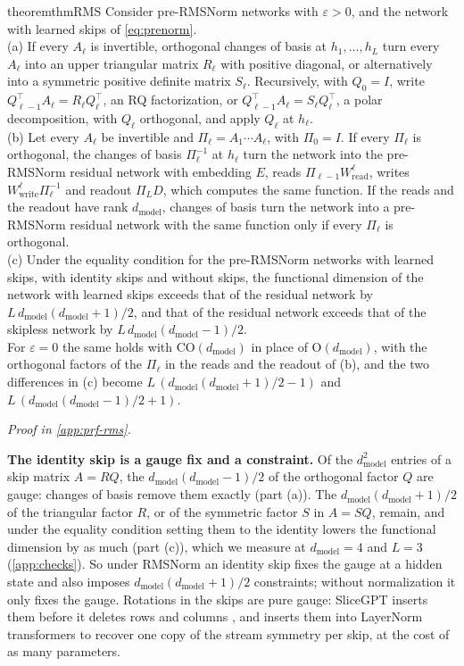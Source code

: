\documentclass[10pt]{article}
\theoremstyle{definition}
\theoremstyle{remark}
\newcommand{\Wread}{W_{\mathrm{read}}}
\newcommand{\Wwrite}{W_{\mathrm{write}}}
\newcommand{\dm}{d_{\mathrm{model}}}
\newcommand{\Ort}{\mathrm{O}}
\newcommand{\CO}{\mathrm{CO}}
\newcommand{\para}[1]{\smallskip\noindent\textbf{#1}\hspace{0.5em}}
\newcommand{\proofin}[1]{\par\vspace{-0.4\baselineskip}\noindent\hfill{\small\itshape Proof in \cref{#1}.}\par\smallskip}
\begin{document}
\begin{restatable}{theorem}{thmRMS}\label{thm:rms}
Consider pre-RMSNorm networks with $\varepsilon > 0$, and the network with learned skips of \cref{eq:prenorm}.\\
\textup{(a)} If every $A_\ell$ is invertible, orthogonal changes of basis at $h_1, \dots, h_L$ turn every $A_\ell$ into an upper triangular matrix $R_\ell$ with positive diagonal, or alternatively into a symmetric positive definite matrix $S_\ell$. Recursively, with $Q_0 = I$, write $Q_{\ell-1}^\top A_\ell = R_\ell Q_\ell^\top$, an RQ factorization, or $Q_{\ell-1}^\top A_\ell = S_\ell Q_\ell^\top$, a polar decomposition, with $Q_\ell$ orthogonal, and apply $Q_\ell$ at $h_\ell$.\\
\textup{(b)} Let every $A_\ell$ be invertible and $\Pi_\ell = A_1\cdots A_\ell$, with $\Pi_0 = I$. If every $\Pi_\ell$ is orthogonal, the changes of basis $\Pi_\ell^{-1}$ at $h_\ell$ turn the network into the pre-RMSNorm residual network with embedding $E$, reads $\Pi_{\ell-1}\Wread^{\ell}$, writes $\Wwrite^{\ell}\Pi_\ell^{-1}$ and readout $\Pi_LD$, which computes the same function. If the reads and the readout have rank $\dm$, changes of basis turn the network into a pre-RMSNorm residual network with the same function only if every $\Pi_\ell$ is orthogonal.\\
\textup{(c)} Under the equality condition for the pre-RMSNorm networks with learned skips, with identity skips and without skips, the functional dimension of the network with learned skips exceeds that of the residual network by $L\,\dm(\dm+1)/2$, and that of the residual network exceeds that of the skipless network by $L\,\dm(\dm-1)/2$.\\
For $\varepsilon = 0$ the same holds with $\CO(\dm)$ in place of $\Ort(\dm)$, with the orthogonal factors of the $\Pi_\ell$ in the reads and the readout of (b), and the two differences in (c) become $L\,(\dm(\dm+1)/2 - 1)$ and $L\,(\dm(\dm-1)/2 + 1)$.
\end{restatable}
\proofin{app:prf-rms}

\para{The identity skip is a gauge fix and a constraint.} Of the $\dm^2$ entries of a skip matrix $A = RQ$, the $\dm(\dm-1)/2$ of the orthogonal factor $Q$ are gauge: changes of basis remove them exactly (part (a)). The $\dm(\dm+1)/2$ of the triangular factor $R$, or of the symmetric factor $S$ in $A = SQ$, remain, and under the equality condition setting them to the identity lowers the functional dimension by as much (part (c)), which we measure at $\dm = 4$ and $L = 3$ (\cref{app:checks}). So under RMSNorm an identity skip fixes the gauge at a hidden state and also imposes $\dm(\dm+1)/2$ constraints; without normalization it only fixes the gauge. Rotations in the skips are pure gauge: SliceGPT inserts them before it deletes rows and columns \citep[Sections~3.3 and~3.4]{ashkboos2024slicegpt}, and \citet[Section~4.6]{vannierop2024gauge} inserts them into LayerNorm transformers to recover one copy of the stream symmetry per skip, at the cost of as many parameters.
\end{document}
